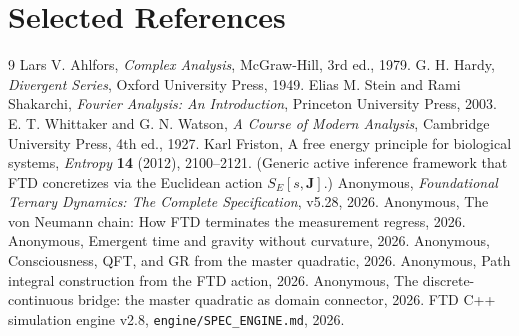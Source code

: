 \documentclass[11pt]{article}
\theoremstyle{tight}
\theoremstyle{plainroman}
\begin{document}
\section{Selected References}
\begin{thebibliography}{9}
Lars V. Ahlfors,
\emph{Complex Analysis},
McGraw-Hill, 3rd ed., 1979.
G. H. Hardy,
\emph{Divergent Series},
Oxford University Press, 1949.
Elias M. Stein and Rami Shakarchi,
\emph{Fourier Analysis: An Introduction},
Princeton University Press, 2003.
E. T. Whittaker and G. N. Watson,
\emph{A Course of Modern Analysis},
Cambridge University Press, 4th ed., 1927.
Karl Friston,
A free energy principle for biological systems,
\emph{Entropy} \textbf{14} (2012), 2100--2121.
(Generic active inference framework that FTD concretizes via the Euclidean action $S_E[s,\mathbf J]$.)
Anonymous,
\emph{Foundational Ternary Dynamics: The Complete Specification}, v5.28, 2026.
Anonymous,
The von Neumann chain: How FTD terminates the measurement regress, 2026.
Anonymous,
Emergent time and gravity without curvature, 2026.
Anonymous,
Consciousness, QFT, and GR from the master quadratic, 2026.
Anonymous,
Path integral construction from the FTD action, 2026.
Anonymous,
The discrete-continuous bridge: the master quadratic as domain connector, 2026.
FTD C++ simulation engine v2.8, \texttt{engine/SPEC\_ENGINE.md}, 2026.
\end{thebibliography}
\end{document}
